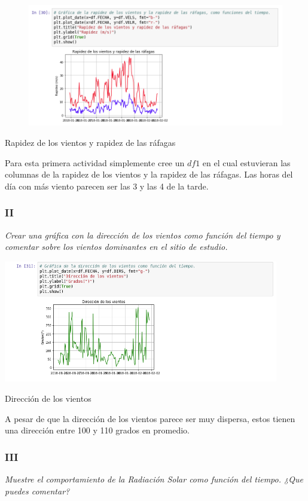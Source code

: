 \documentclass{article}
\begin{document}
\begin{center}
\begin{figure}[h]
\centering
\includegraphics[width=12cm]{Act2i.png}
\end{figure}
    Rapidez de los vientos y rapidez de las ráfagas
\end{center}

Para esta primera actividad simplemente cree un $df1$ en el cual estuvieran las columnas de la rapidez de los vientos y la rapidez de las ráfagas. Las horas del día con más viento parecen ser las 3 y las 4 de la tarde.

\subsubsection{II}
\textit{Crear una gráfica con la dirección de los vientos como función del tiempo y comentar sobre los vientos dominantes en el sitio de estudio.}

\begin{center}
	\includegraphics[width=12cm]{Act2ii.png}
    
    Dirección de los vientos
\end{center}
\vspace{0.3cm}

A pesar de que la dirección de los vientos parece ser muy dispersa, estos tienen una dirección entre 100 y 110 grados en promedio.

\subsubsection{III}
\textit{Muestre el comportamiento de la Radiación Solar como función del tiempo. ¿Que puedes comentar?} 
\end{document}
